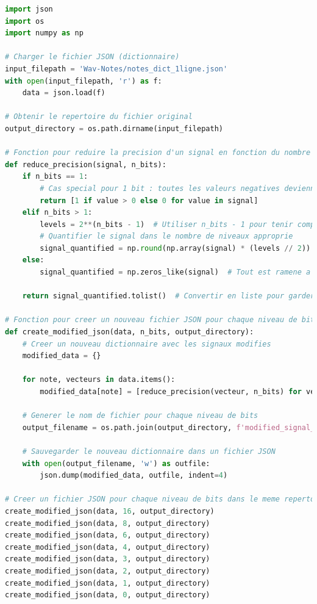\documentclass[11pt,letterpaper]{article}
\begin{document}
\begin{lstlisting}[language=python]
import json
import os
import numpy as np

# Charger le fichier JSON (dictionnaire)
input_filepath = 'Wav-Notes/notes_dict_1ligne.json'
with open(input_filepath, 'r') as f:
    data = json.load(f)

# Obtenir le repertoire du fichier original
output_directory = os.path.dirname(input_filepath)

# Fonction pour reduire la precision d'un signal en fonction du nombre de bits
def reduce_precision(signal, n_bits):
    if n_bits == 1:
        # Cas special pour 1 bit : toutes les valeurs negatives deviennent 0
        return [1 if value > 0 else 0 for value in signal]
    elif n_bits > 1:
        levels = 2**(n_bits - 1)  # Utiliser n_bits - 1 pour tenir compte du bit de signe
        # Quantifier le signal dans le nombre de niveaux approprie
        signal_quantified = np.round(np.array(signal) * (levels // 2)) / (levels // 2)
    else:
        signal_quantified = np.zeros_like(signal)  # Tout est ramene a zero pour 0 bit
    
    return signal_quantified.tolist()  # Convertir en liste pour garder le format JSON

# Fonction pour creer un nouveau fichier JSON pour chaque niveau de bits
def create_modified_json(data, n_bits, output_directory):
    # Creer un nouveau dictionnaire avec les signaux modifies
    modified_data = {}
    
    for note, vecteurs in data.items():
        modified_data[note] = [reduce_precision(vecteur, n_bits) for vecteur in vecteurs]
    
    # Generer le nom de fichier pour chaque niveau de bits
    output_filename = os.path.join(output_directory, f'modified_signal_{n_bits}bit.json')
    
    # Sauvegarder le nouveau dictionnaire dans un fichier JSON
    with open(output_filename, 'w') as outfile:
        json.dump(modified_data, outfile, indent=4)

# Creer un fichier JSON pour chaque niveau de bits dans le meme repertoire que le fichier original
create_modified_json(data, 16, output_directory)
create_modified_json(data, 8, output_directory)
create_modified_json(data, 6, output_directory)
create_modified_json(data, 4, output_directory)
create_modified_json(data, 3, output_directory)
create_modified_json(data, 2, output_directory)
create_modified_json(data, 1, output_directory)
create_modified_json(data, 0, output_directory)
\end{lstlisting}
\end{document}
